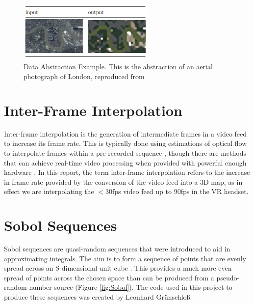 
\begin{figure}[H]
    \begin{center}
      \includegraphics[width=0.6\textwidth]{Figures/abstraction3rdyear.png}
      \caption[Data Abstraction Example]{Data Abstraction Example. This is the abstraction of an aerial photograph of London, reproduced from \cite{abstraction3rdyear}}
      \label{fig:abstraction3rdyear}
    \end{center}
\end{figure}

\section{Inter-Frame Interpolation}

Inter-frame interpolation is the generation of intermediate frames in a video feed to increase its frame rate. This is typically done using estimations of optical flow to interpolate frames within a pre-recorded sequence \cite{ribas1993interframe}, though there are methods that can achieve real-time video processing when provided with powerful enough hardware \cite{shi2016real}. In this report, the term inter-frame interpolation refers to the increase in frame rate provided by the conversion of the video feed into a 3D map, as in effect we are interpolating the $<$30fps video feed up to 90fps in the VR headset.

\section{Sobol Sequences}

Sobol sequences are quasi-random sequences that were introduced to aid in approximating integrals. The aim is to form a sequence of points that are evenly spread across an S-dimensional unit cube \cite{joe2008constructing}. This provides a much more even spread of points across the chosen space than can be produced from a pseudo-random number source (Figure \ref{fig:Sobol}). The code used in this project to produce these sequences was created by Leonhard Gr\"unschlo\ss\space \cite{CodeSource}.

